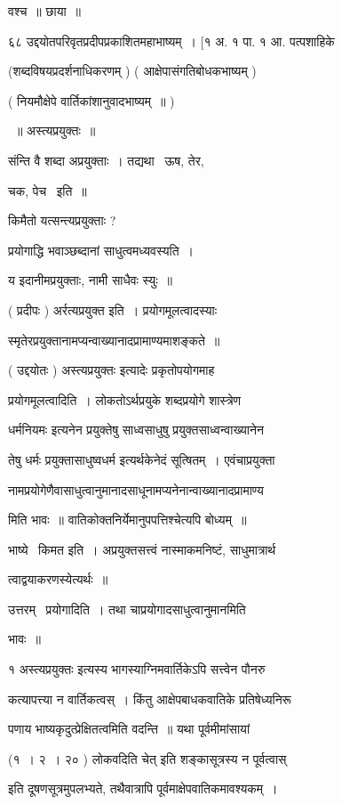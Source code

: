 \documentclass[11pt, openany]{book}
\begin{document}
वश्च~॥ छाया~॥ 

६८ उद्दयोतपरिवृतप्रदीपप्रकाशितमहाभाष्यम्~। [१ अ. १ पा. १ आ.
पत्पशाहिके 

(शब्दविषयप्रदर्शनाधिकरणम् ) ( आक्षेपासंगतिबोधकभाष्यम् ) 

( नियमौक्षेपे वार्तिकांशानुवादभाष्यम्~॥ )

~॥ अस्त्यप्रयुक्तः~॥ 

संन्ति वै शब्दा अप्रयुक्ताः~। तद्यथा \textendash\ ऊष, तेर, 

चक, पेच \textendash\ इति~॥ 

किमैतो यत्सन्त्यप्रयुक्ताः ? 

प्रयोगाद्धि भवाञ्छब्दानां साधुत्वमध्यवस्यति~। 

य इदानीमप्रयुक्ताः, नामी साधैवः स्युः~॥ 

( प्रदीपः ) अर्रत्यप्रयुक्त इति~। प्रयोगमूलत्वादस्याः 

स्मृतेरप्रयुक्तानामप्यन्वाख्यानादप्रामाण्यमाशङ्कते~॥ 

( उद्दयोतः ) {\qt अस्त्यप्रयुक्तः} इत्यादेः प्रकृतोपयोगमाह \textendash\ 

प्रयोगमूलत्वादिति~। लोकतोऽर्थप्रयुके शब्दप्रयोगे शास्त्रेण 

धर्मनियमः इत्यनेन प्रयुक्तेषु साध्वसाधुषु प्रयुक्तसाध्वन्वाख्यानेन 

तेषु धर्मः प्रयुक्तासाधुष्वधर्म इत्यर्थकेनेदं सूत्षितम्~। 
एवंचाप्रयुक्ता \textendash\ 

नामप्रयोगेणैवासाधुत्वानुमानादसाधूनामप्यनेनान्वाख्यानादप्रामाण्य \textendash\ 

मिति भावः~॥ वातिकोक्तनिर्येमानुपपत्तिश्चेत्यपि बोध्यम्~॥ 

भाष्ये \textendash\ किमत इति~। अप्रयुक्तसत्त्वं नास्माकमनिष्टं, साधुमात्रार्थ \textendash\ 

त्वाद्वयाकरणस्येत्यर्थः~॥ 

उत्तरम् \textendash\ प्रयोगादिति~। तथा चाप्रयोगादसाधुत्वानुमानमिति 

भावः~॥ 



१ {\qt अस्त्यप्रयुक्तः} इत्यस्य भागस्याग्निमवार्तिकेऽपि सत्त्वेन पौनरु \textendash\ 

कत्यापत्त्या न वार्तिकत्वस्~। किंतु आक्षेपबाधकवातिके प्रतिषेध्यनिरू \textendash\ 

पणाय भाष्यकृदुत्प्रेक्षितत्वमिति वदन्ति~॥ यथा पूर्वमीमांसायां 

(१~। २~। २० ) {\qt लोकवदिति चेत्} इति शङ्कासूत्रस्य {\qt न पूर्वत्वास्}

इति दूषणसूत्रमुपलभ्यते, तथैवात्रापि पूर्वमाक्षेपवातिकमावश्यकम्~। 
\end{document}
